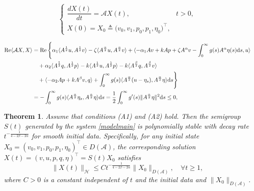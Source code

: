 \documentclass[10pt,a4paper]{amsart}
\newtheorem{theorem}{Theorem}
\begin{document}
	\begin{equation}\label{modelmain}
		\begin{cases}
			\dfrac{dX(t)}{dt}=\mathcal{A} X(t), & t>0, \\
			X(0)=X_0\triangleq \big(v_0,v_1,p_0,p_1,\eta_0\big)^\top,
		\end{cases}
	\end{equation}

		\begin{align}\label{dissipative}
			\operatorname{Re}\langle \mathcal{A}X, X \rangle
			&= \operatorname{Re}\Bigg\{ \alpha_1 \langle A^{\frac{1}{2}}u, A^{\frac{1}{2}}v \rangle - \zeta \langle A^{\frac{\alpha}{2}}u, A^{\frac{\alpha}{2}}v \rangle+ \langle -\alpha_1 A v + k A p + \zeta A^\alpha v - \int_0^\infty g(s)A^\alpha \eta(s)\mathrm{d}s, u \rangle \notag\\
			&\quad + \alpha_2 \langle A^{\frac{1}{2}}q, A^{\frac{1}{2}}p \rangle-k\langle A^{\frac{1}{2}} u, A^{\frac{1}{2}} p\rangle
			-k\langle A^{\frac{\beta}{2}} q, A^{\frac{\beta}{2}} v\rangle\notag\\
			&\quad + \langle -\alpha_2 A p + k A^\beta v, q \rangle  + \int_0^\infty g(s)\langle A^{\frac{\alpha}{2}}(u - \eta_s), A^{\frac{\alpha}{2}}\eta \rangle \mathrm{d}s \Bigg\} \notag\\
			&= -\int_0^\infty g(s)\langle A^{\frac{\alpha}{2}}\eta_s, A^{\frac{\alpha}{2}}\eta \rangle \mathrm{d}s= \frac{1}{2}\int_0^\infty g'(s)\|A^{\frac{\alpha}{2}}\eta\|^2 \mathrm{d}s \le 0,		
		\end{align}

	\begin{theorem}\label{thmdecay}
		Assume that conditions (A1) and (A2) hold. Then the semigroup \(S(t)\) generated by the system \eqref{modelmain} is polynomially stable with decay rate \(t^{-\frac{1}{4-2\beta-2\alpha}}\) for smooth initial data. Specifically, for any initial state \(X_0=(v_0, v_1, p_0, p_1, \eta_0)^\top \in D(\mathcal{A})\), the corresponding solution $X(t)=(v,u,p,q,\eta)^\top=S(t)X_0$ satisfies
		\[
		\|X(t)\|_{\mathcal{H}} \leq C t^{-\frac{1}{4-2\beta-2\alpha}} \|X_0\|_{D(\mathcal{A})}, \quad \forall t \geq 1,
		\]
		where \(C > 0\) is a constant independent of \(t\) and the initial data and $\|X_0\|_{D(\mathcal{A})}$.
	\end{theorem}
\end{document}

